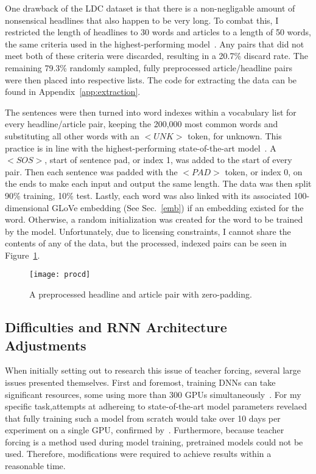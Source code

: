 One drawback of the LDC dataset is that there is a non-negligable amount of nonsensical headlines that also happen to be very long. To combat this, I restricted the length of headlines to 30 words and articles to a length of 50 words, the same criteria used in the highest-performing model~\cite{Liu2016}. Any pairs that did not meet both of these criteria were discarded, resulting in a 20.7\% discard rate. The remaining 79.3\% randomly sampled, fully preprocessed article/headline pairs were then placed into respective lists. The code for extracting the data can be found in Appendix~\ref{app:extraction}.

The sentences were then turned into word indexes within a vocabulary list for every headline/article pair, keeping the 200,000 most common words and substituting all other words with an $<UNK>$ token, for unknown. This practice is in line with the highest-performing state-of-the-art model~\cite{Liu2016}. A $<SOS>$, start of sentence pad, or index 1, was added to the start of every pair. Then each sentence was padded with the $<PAD>$ token, or index 0, on the ends to make each input and output the same length. The data was then split 90\% training, 10\% test. Lastly, each word was also linked with its associated 100-dimensional GLoVe embedding (See Sec.~\ref{emb}) if an embedding existed for the word. Otherwise, a random initialization was created for the word to be trained by the model. Unfortunately, due to licensing constraints, I cannot share the contents of any of the data, but the processed, indexed pairs can be seen in Figure~\ref{fig:procd}.

\begin{figure}[h]
  \centering
  \texttt{[image: procd]}
  \caption{A preprocessed headline and article pair with zero-padding.}
  \label{fig:procd}
\end{figure}

\subsection{Difficulties and RNN Architecture Adjustments}
When initially setting out to research this issue of teacher forcing, several large issues presented themselves. First and foremost, training DNNs can take significant resources, some using more than 300 GPUs simultaneously~\cite{Silver2016}. For my specific task,attempts at adhereing to state-of-the-art model parameters revelaed that fully training such a model from scratch would take over 10 days per experiment on a single GPU, confirmed by~\cite{Nallapati2016a}. Furthermore, because teacher forcing is a method used during model training, pretrained models could not be used. Therefore, modifications were required to achieve results within a reasonable time.

